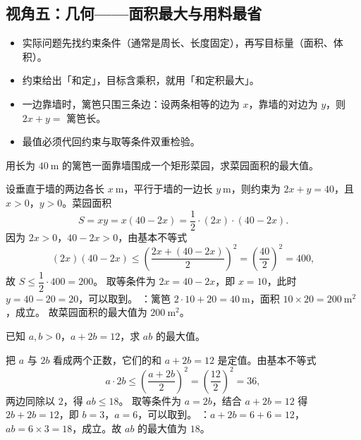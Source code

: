 \begin{explore}
\subsection{视角五：几何——面积最大与用料最省}

\begin{itemize}
  \item 实际问题先找约束条件（通常是周长、长度固定），再写目标量（面积、体积）。
  \item 约束给出「和定」，目标含乘积，就用「和定积最大」。
  \item 一边靠墙时，篱笆只围三条边：设两条相等的边为 $x$，靠墙的对边为 $y$，则 $2x+y=$ 篱笆长。
  \item 最值必须代回约束与取等条件双重检验。
\end{itemize}

\begin{example}
用长为 $40\ \mathrm{m}$ 的篱笆一面靠墙围成一个矩形菜园，求菜园面积的最大值。
\end{example}
\begin{solution}
设垂直于墙的两边各长 $x\ \mathrm{m}$，平行于墙的一边长 $y\ \mathrm{m}$，则约束为
$2x+y=40$，且 $x>0$，$y>0$。菜园面积
\[
  S=xy=x(40-2x)=\frac12\cdot(2x)\cdot(40-2x).
\]
因为 $2x>0$，$40-2x>0$，由基本不等式
\[
  (2x)(40-2x)\leq\left(\frac{2x+(40-2x)}{2}\right)^2=\left(\frac{40}{2}\right)^2=400,
\]
故 $S\leq\dfrac12\cdot400=200$。
取等条件为 $2x=40-2x$，即 $x=10$，此时 $y=40-20=20$，可以取到。
：篱笆 $2\cdot10+20=40\ \mathrm{m}$，面积 $10\times20=200\ \mathrm{m}^2$，成立。
故菜园面积的最大值为 $200\ \mathrm{m}^2$。
\end{solution}

\begin{problem}
已知 $a,b>0$，$a+2b=12$，求 $ab$ 的最大值。
\end{problem}
\begin{solution}
把 $a$ 与 $2b$ 看成两个正数，它们的和 $a+2b=12$ 是定值。由基本不等式
\[
  a\cdot2b\leq\left(\frac{a+2b}{2}\right)^2=\left(\frac{12}{2}\right)^2=36,
\]
两边同除以 $2$，得 $ab\leq18$。
取等条件为 $a=2b$，结合 $a+2b=12$ 得 $2b+2b=12$，即 $b=3$，$a=6$，可以取到。
：$a+2b=6+6=12$，$ab=6\times3=18$，成立。故 $ab$ 的最大值为 $18$。
\end{solution}
\end{explore}

